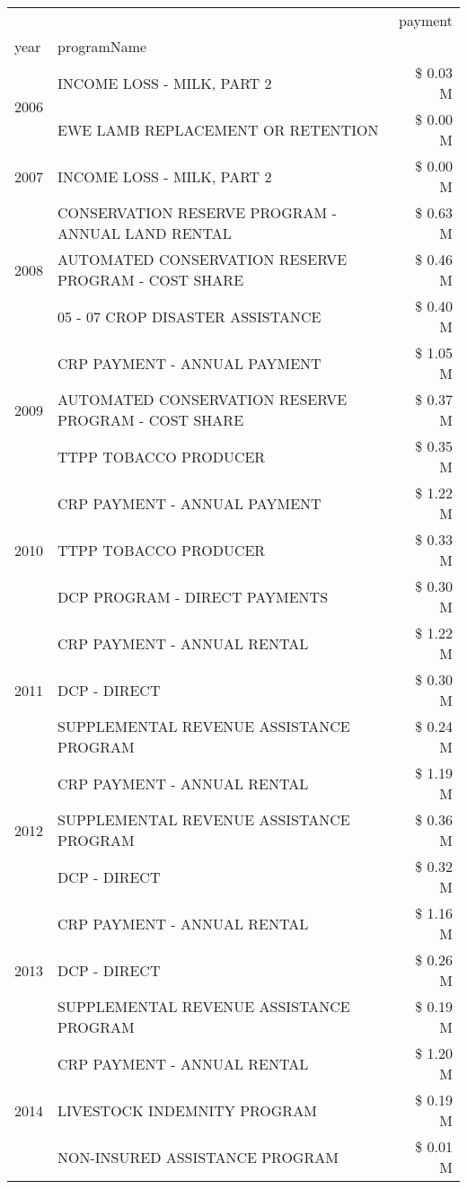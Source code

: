 \begin{tabular}{llr}
\toprule
 &  & payment \\
year & programName &  \\
\midrule
\multirow[t]{2}{*}{2006} & INCOME LOSS - MILK, PART 2 & \$ 0.03 M \\
 & EWE LAMB REPLACEMENT OR RETENTION & \$ 0.00 M \\
\cline{1-3}
2007 & INCOME LOSS - MILK, PART 2 & \$ 0.00 M \\
\cline{1-3}
\multirow[t]{3}{*}{2008} & CONSERVATION RESERVE PROGRAM - ANNUAL LAND RENTAL & \$ 0.63 M \\
 & AUTOMATED CONSERVATION RESERVE PROGRAM - COST SHARE & \$ 0.46 M \\
 & 05 - 07 CROP DISASTER ASSISTANCE & \$ 0.40 M \\
\cline{1-3}
\multirow[t]{3}{*}{2009} & CRP PAYMENT - ANNUAL PAYMENT & \$ 1.05 M \\
 & AUTOMATED CONSERVATION RESERVE PROGRAM - COST SHARE & \$ 0.37 M \\
 & TTPP TOBACCO PRODUCER & \$ 0.35 M \\
\cline{1-3}
\multirow[t]{3}{*}{2010} & CRP PAYMENT - ANNUAL PAYMENT & \$ 1.22 M \\
 & TTPP TOBACCO PRODUCER & \$ 0.33 M \\
 & DCP PROGRAM - DIRECT PAYMENTS & \$ 0.30 M \\
\cline{1-3}
\multirow[t]{3}{*}{2011} & CRP PAYMENT - ANNUAL RENTAL & \$ 1.22 M \\
 & DCP - DIRECT & \$ 0.30 M \\
 & SUPPLEMENTAL REVENUE ASSISTANCE PROGRAM & \$ 0.24 M \\
\cline{1-3}
\multirow[t]{3}{*}{2012} & CRP PAYMENT - ANNUAL RENTAL & \$ 1.19 M \\
 & SUPPLEMENTAL REVENUE ASSISTANCE PROGRAM & \$ 0.36 M \\
 & DCP - DIRECT & \$ 0.32 M \\
\cline{1-3}
\multirow[t]{3}{*}{2013} & CRP PAYMENT - ANNUAL RENTAL & \$ 1.16 M \\
 & DCP - DIRECT & \$ 0.26 M \\
 & SUPPLEMENTAL REVENUE ASSISTANCE PROGRAM & \$ 0.19 M \\
\cline{1-3}
\multirow[t]{3}{*}{2014} & CRP PAYMENT - ANNUAL RENTAL & \$ 1.20 M \\
 & LIVESTOCK INDEMNITY PROGRAM & \$ 0.19 M \\
 & NON-INSURED ASSISTANCE PROGRAM & \$ 0.01 M \\

\end{tabular}
